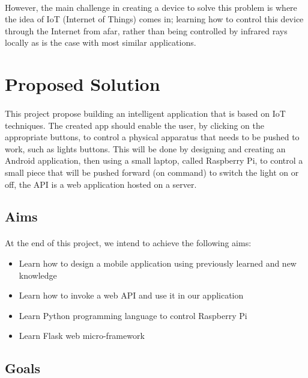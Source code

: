 \documentclass[12pt, oneside, a4paper]{book}
\begin{document}
		\paragraph{}However, the main challenge in creating a device to solve this problem is where the idea of IoT (Internet of Things) comes in; learning how to control this device through the Internet from afar, rather than being controlled by infrared rays locally as is the case with most similar applications. 
		\section{Proposed Solution}
		\paragraph{}This project propose building an intelligent application that is based on IoT techniques. The created app should enable the user, by clicking on the appropriate buttons, to control a physical apparatus that needs to be pushed to work, such as lights buttons. This will be done by designing and creating an Android application, then using a small laptop, called Raspberry Pi, to control a small piece that will be pushed forward (on command) to switch the light on or off, the API is a web application hosted on a server.
		
		\subsection{Aims}
			\paragraph{}At the end of this project, we intend to achieve the following aims:
			\begin{itemize}
	 			\item Learn how to design a mobile application using previously learned and new knowledge
				\item Learn how to invoke a web API and use it in our application
				\item Learn Python programming language to control Raspberry Pi
				\item Learn Flask web micro-framework
			\end{itemize}
		\subsection{Goals}
\end{document}
